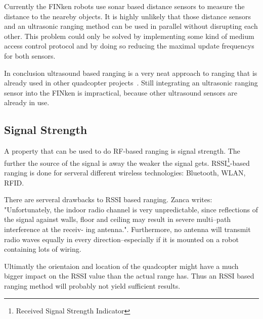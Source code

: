 Currently the FINken robots use sonar based distance sensors to measure the distance to the neareby objects.
It is highly unlikely that those distance sensors and an ultrasonic ranging method can be used in parallel without disrupting each other.
This problem could only be solved by implementing some kind of medium access control protocol and by doing so reducing the maximal update frequencys for both sensors.


In conclusion ultrasound based ranging is a very neat approach to ranging that is already used in other quadcopter projects~\cite{ultrasonic_erlangen}.
Still integrating an ultrasonic ranging sensor into the FINken is impractical, because other ultrasound sensors are already in use.


\subsection{Signal Strength}

A property that can be used to do RF-based ranging is signal strength.
The further the source of the signal is away the weaker the signal gets.
RSSI\footnote{Received Signal Strength Indicator}-based ranging is done for serveral different wireless technologies: Bluetooth\cite{pei_using_2010}, WLAN\cite{wlanrssi, wlanrssi2}, RFID\cite{rfidrssi}.

There are serveral drawbacks to RSSI based ranging. Zanca \cite{Zanca} writes: "Unfortunately, the indoor radio channel is very
unpredictable, since reflections of the signal against walls, floor and ceiling may result in severe multi–path interference at the receiv-
ing antenna.".
Furthermore, no antenna will transmit radio waves equally in every direction–especially if it is mounted on a robot containing lots of wiring.

Ultimatly the orientaion and location of the quadcopter might have a much bigger impact on the RSSI value than the actual range has.
Thus an RSSI based ranging method will probably not yield sufficient results.


